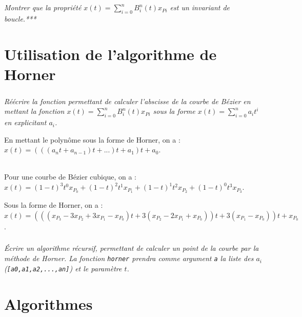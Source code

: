 \documentclass[10pt,fleqn]{article} %
\begin{document}
\subparagraph{}
\textit{Montrer que la propriété $x(t)=\sum\limits_{i=0}^{n} B_i^n(t) x_{Pi}$ est un invariant de boucle.***}

\section{Utilisation de l'algorithme de Horner}

\subparagraph{}
\textit{Réécrire la fonction permettant de calculer l'abscisse de la courbe de Bézier en mettant la fonction $x(t)=\sum\limits_{i=0}^{n} B_i^n(t) x_{Pi}$ sous la forme $x(t)=\sum\limits_{i=0}^{n} a_i t^i$ en explicitant $a_i$.}

En mettant le polynôme sous la forme de Horner, on a : 
$x(t)=\left(\left(\left(a_nt+a_{n-1}\right)t+...\right)t+a_1\right)t+a_0$.

\begin{exemple}~\\

Pour une courbe de Bézier cubique, on a : $x(t)=  \left(1-t \right)^3 t^0 x_{P_0} +\left(1-t \right)^2 t^1 x_{P_1} +\left(1-t \right)^1 t^2 x_{P_2} +\left(1-t \right)^0 t^3 x_{P_3}$.

Sous la forme de Horner, on a : $x(t)=\left(\left(\left(x_{P_3}-3x_{P_2}+3x_{P_1}-x_{P_0}\right)t+3\left(x_{P_2}-2x_{P_1}+x_{P_0}\right)\right)t+3\left( x_{P_1}-x_{P_0}\right)\right)t+x_{P_0}$.
\end{exemple}


\subparagraph{}
\textit{Écrire un algorithme récursif, permettant de calculer un point de la courbe par la méthode de Horner. La fonction \texttt{horner} prendra comme argument \texttt{a} la liste des $a_i$ (\texttt{[a0,a1,a2,...,an]}) et le paramètre $t$.}


\section*{Algorithmes}
\end{document}
